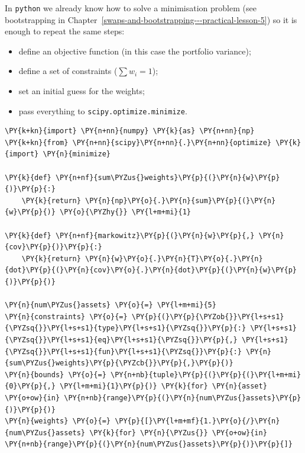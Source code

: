 In \texttt{python} we already know how to solve a minimisation problem
(see bootstrapping in Chapter~\ref{swaps-and-bootstrapping---practical-lesson-5}) 
so it is enough to repeat the same steps:

\begin{itemize}
\tightlist
\item
  define an objective function (in this case the portfolio variance);
\item
  define a set of constraints ($\sum w_i = 1$);
\item
  set an initial guess for the weights;
\item
  pass everything to \texttt{scipy.optimize.minimize}.
\end{itemize}

\begin{tcolorbox}[breakable, size=fbox, boxrule=1pt, pad at break*=1mm,colback=cellbackground, colframe=cellborder]
\begin{Verbatim}[commandchars=\\\{\}]
\PY{k+kn}{import} \PY{n+nn}{numpy} \PY{k}{as} \PY{n+nn}{np}
\PY{k+kn}{from} \PY{n+nn}{scipy}\PY{n+nn}{.}\PY{n+nn}{optimize} \PY{k}{import} \PY{n}{minimize}
		
\PY{k}{def} \PY{n+nf}{sum\PYZus{}weights}\PY{p}{(}\PY{n}{w}\PY{p}{)}\PY{p}{:} 
    \PY{k}{return} \PY{n}{np}\PY{o}{.}\PY{n}{sum}\PY{p}{(}\PY{n}{w}\PY{p}{)} \PY{o}{\PYZhy{}} \PY{l+m+mi}{1}
		
\PY{k}{def} \PY{n+nf}{markowitz}\PY{p}{(}\PY{n}{w}\PY{p}{,} \PY{n}{cov}\PY{p}{)}\PY{p}{:}
    \PY{k}{return} \PY{n}{w}\PY{o}{.}\PY{n}{T}\PY{o}{.}\PY{n}{dot}\PY{p}{(}\PY{n}{cov}\PY{o}{.}\PY{n}{dot}\PY{p}{(}\PY{n}{w}\PY{p}{)}\PY{p}{)}
		
\PY{n}{num\PYZus{}assets} \PY{o}{=} \PY{l+m+mi}{5}
\PY{n}{constraints} \PY{o}{=} \PY{p}{(}\PY{p}{\PYZob{}}\PY{l+s+s1}{\PYZsq{}}\PY{l+s+s1}{type}\PY{l+s+s1}{\PYZsq{}}\PY{p}{:} \PY{l+s+s1}{\PYZsq{}}\PY{l+s+s1}{eq}\PY{l+s+s1}{\PYZsq{}}\PY{p}{,} \PY{l+s+s1}{\PYZsq{}}\PY{l+s+s1}{fun}\PY{l+s+s1}{\PYZsq{}}\PY{p}{:} \PY{n}{sum\PYZus{}weights}\PY{p}{\PYZcb{}}\PY{p}{,}\PY{p}{)} 
\PY{n}{bounds} \PY{o}{=} \PY{n+nb}{tuple}\PY{p}{(}\PY{p}{(}\PY{l+m+mi}{0}\PY{p}{,} \PY{l+m+mi}{1}\PY{p}{)} \PY{k}{for} \PY{n}{asset} \PY{o+ow}{in} \PY{n+nb}{range}\PY{p}{(}\PY{n}{num\PYZus{}assets}\PY{p}{)}\PY{p}{)}
\PY{n}{weights} \PY{o}{=} \PY{p}{[}\PY{l+m+mf}{1.}\PY{o}{/}\PY{n}{num\PYZus{}assets} \PY{k}{for} \PY{n}{\PYZus{}} \PY{o+ow}{in} \PY{n+nb}{range}\PY{p}{(}\PY{n}{num\PYZus{}assets}\PY{p}{)}\PY{p}{]}
		

\end{Verbatim}
\end{tcolorbox}
